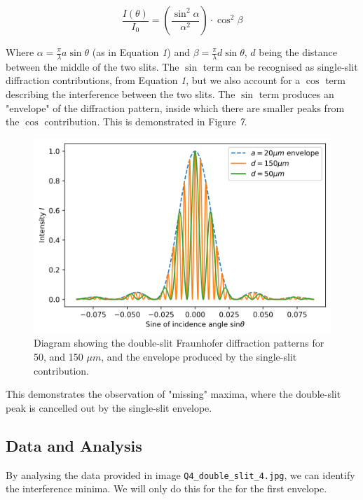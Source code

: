 \documentclass[a4paper]{article}
\begin{document}
\begin{equation}
\frac{I(\theta)}{I_0}=\left(\frac{\sin^2\alpha}{\alpha^2}\right)\cdot\cos^2\beta
\end{equation}

Where $\alpha=\frac\pi\lambda a\sin\theta$ (as in Equation \emph{1}) and $\beta=\frac\pi\lambda d\sin\theta$, $d$ being the distance between the middle of the two slits. The $\sin$ term can be recognised as single-slit diffraction contributions, from Equation \emph{1}, but we also account for a $\cos$ term describing the interference between the two slits. The $\sin$ term produces an "envelope" of the diffraction pattern, inside which there are smaller peaks from the $\cos$ contribution. This is demonstrated in Figure \emph{7}.

\begin{figure}[h!]
\centerline{\includegraphics[scale=0.6]{double.png}}
\caption{Diagram showing the double-slit Fraunhofer diffraction patterns for 50, and 150 $\mu m$, and the envelope produced by the single-slit contribution.}
\label{fig:doubledemo}
\end{figure}

This demonstrates the observation of "missing" maxima, where the double-slit peak is cancelled out by the single-slit envelope. 
\newpage
\subsection{Data and Analysis}

By analysing the data provided in image \lstinline$Q4_double_slit_4.jpg$, we can identify the interference minima. We will only do this for the for the first envelope.
\end{document}
